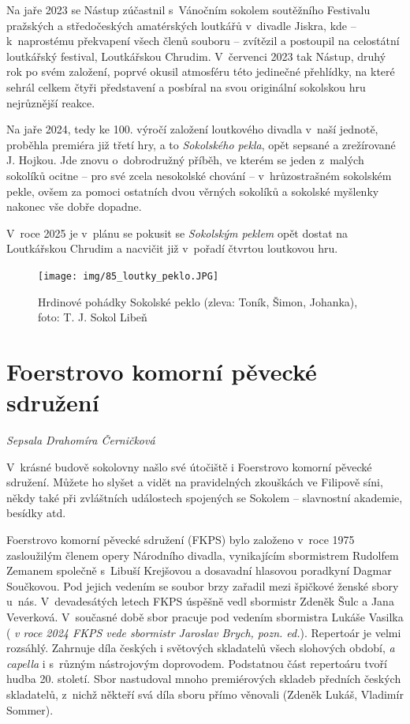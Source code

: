 \documentclass[a5paper, 11pt, twoside]{article}
\newcommand{\pozned}[1]{%
\textit{#1}}
\begin{document}
Na jaře 2023 se Nástup zúčastnil s~Vánočním sokolem soutěžního Festivalu
pražských a středočeských amatérských loutkářů v~divadle Jiskra, kde --
k~naprostému překvapení všech členů souboru -- zvítězil a postoupil na
celostátní loutkářský festival, Loutkářskou Chrudim. V~červenci 2023 tak
Nástup, druhý rok po svém založení, poprvé okusil atmosféru této
jedinečné přehlídky, na které sehrál celkem čtyři představení a posbíral
na svou originální sokolskou hru nejrůznější reakce.

Na jaře 2024, tedy ke 100. výročí založení loutkového divadla v~naší
jednotě, proběhla premiéra již třetí hry, a to \textit{Sokolského pekla},
opět sepsané a zrežírované J. Hojkou. Jde znovu o~dobrodružný příběh, ve
kterém se jeden z~malých sokolíků ocitne -- pro své zcela nesokolské
chování -- v~hrůzostrašném sokolském pekle, ovšem za pomoci ostatních
dvou věrných sokolíků a sokolské myšlenky nakonec vše dobře dopadne.

V~roce 2025 je v~plánu se pokusit se \textit{Sokolským peklem} opět dostat
na Loutkářskou Chrudim a nacvičit již v~pořadí čtvrtou loutkovou hru.

\begin{figure}[h]
  \centering 
  \texttt{[image: img/85\_loutky\_peklo.JPG]}
  \caption*{Hrdinové pohádky Sokolské peklo (zleva: Toník, Šimon, Johanka),
  foto: T. J. Sokol Libeň}
\end{figure}

\section{Foerstrovo komorní pěvecké
sdružení}

\begin{center}
  \textit{Sepsala Drahomíra Černičková}
\end{center}

\noindent
V~krásné budově sokolovny našlo své útočiště i Foerstrovo komorní
pěvecké sdružení. Můžete ho slyšet a vidět na pravidelných zkouškách ve
Filipově síni, někdy také při zvláštních událostech spojených se Sokolem
-- slavnostní akademie, besídky atd.

Foerstrovo komorní pěvecké sdružení (FKPS) bylo založeno v~roce 1975
zasloužilým členem opery Národního divadla, vynikajícím sbormistrem
Rudolfem Zemanem společně s~Libuší Krejšovou a dosavadní hlasovou
poradkyní Dagmar Součkovou. Pod jejich vedením se soubor brzy zařadil
mezi špičkové ženské sbory u~nás. V~devadesátých letech FKPS úspěšně
vedl sbormistr Zdeněk Šulc a Jana Veverková. V~současné době sbor
pracuje pod vedením sbormistra Lukáše Vasilka (\pozned{v roce 2024 FKPS
vede sbormistr Jaroslav Brych, pozn. ed.}). Repertoár je velmi rozsáhlý.
Zahrnuje díla českých i světových skladatelů všech slohových období,
\textit{a capella} i s~různým nástrojovým doprovodem. Podstatnou část
repertoáru tvoří hudba 20. století. Sbor nastudoval mnoho premiérových
skladeb předních českých skladatelů, z~nichž někteří svá díla sboru
přímo věnovali (Zdeněk Lukáš, Vladimír Sommer).
\end{document}
